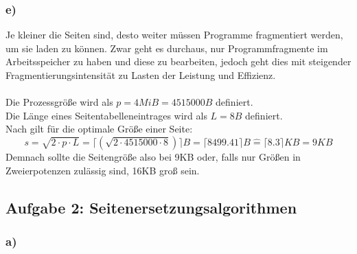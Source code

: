 \documentclass{article}
\begin{document}
\subsubsection*{e)}
Je kleiner die Seiten sind, desto weiter müssen Programme fragmentiert werden, um sie laden zu können.
Zwar geht es durchaus, nur Programmfragmente im Arbeitsspeicher zu haben und diese zu bearbeiten, jedoch geht dies mit steigender Fragmentierungsintensität zu Lasten der Leistung und Effizienz.\\
\vspace{.2cm}\\
Die Prozessgröße wird als $p=4MiB= 4515000B$ definiert.\\
Die Länge eines Seitentabelleneintrages wird als $L=8B$ definiert.\\
Nach \cite{tannenbaum} gilt für die optimale Größe einer Seite:
\[
	s = \sqrt{2\cdot p \cdot L} = \lceil(\sqrt{2 \cdot 4515000 \cdot 8})\rceil B = \lceil8499.41\rceil B \hat{=} \lceil8.3\rceil KB = 9KB
\]
Demnach sollte die Seitengröße also bei 9KB oder, falls nur Größen in Zweierpotenzen zulässig sind, 16KB groß sein.
\subsection*{Aufgabe 2: Seitenersetzungsalgorithmen}
\subsubsection*{a)}
\end{document}
